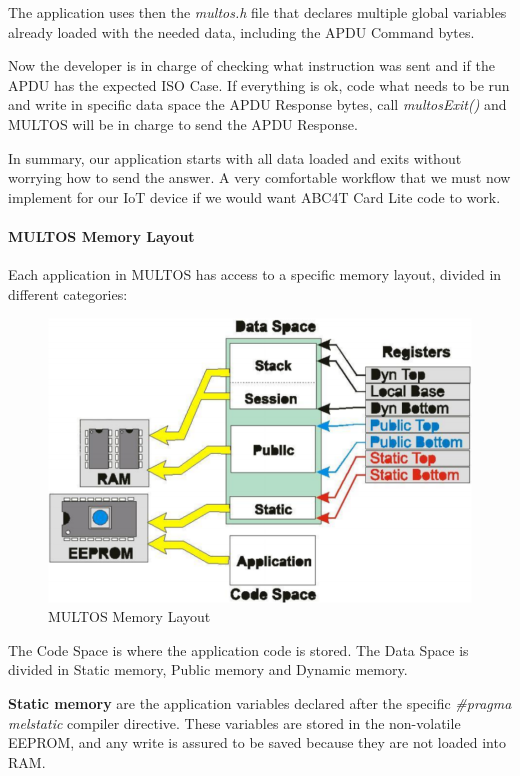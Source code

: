 The application uses then the \textit{multos.h} file that declares multiple global variables already loaded with the needed data, including the APDU Command bytes.

Now the developer is in charge of checking what instruction was sent and if the APDU has the expected ISO Case. If everything is ok, code what needs to be run and write in specific data space the APDU Response bytes, call \textit{multosExit()} and MULTOS will be in charge to send the APDU Response.

In summary, our application starts with all data loaded and exits without worrying how to send the answer. A very comfortable workflow that we must now implement for our IoT device if we would want ABC4T Card Lite code to work.

\paragraph{MULTOS Memory Layout}

Each application in MULTOS has access to a specific memory layout, divided in different categories:

\begin{figure}[bth]
	\begin{center}
		\includegraphics[width=\linewidth]{gfx/multosMemLay}
	\end{center}
	\caption{MULTOS Memory Layout}
	\label{fig:multosMemLay}
\end{figure}


The Code Space is where the application code is stored.
The Data Space is divided in Static memory, Public memory and Dynamic memory.

\textbf{Static memory} are the application variables declared after the specific \textit{\#pragma melstatic} compiler directive. These variables are stored in the non-volatile EEPROM, and any write is assured to be saved because they are not loaded into RAM.

